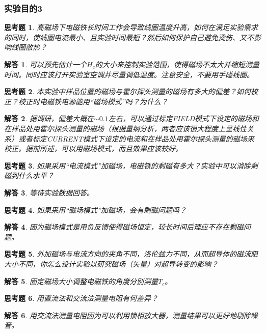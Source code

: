 \documentclass[11pt,a4paper]{ctexart}
\newtheorem{que}{思考题}[section]
\newtheorem{ans}{解答}[section]
\begin{document}
\subsubsection{实验目的3}

\begin{que}
高磁场下电磁铁长时间工作会导致线圈温度升高，如何在满足实验需求的同时，使线圈电流最小、且实验时间最短？然后如何保护自己避免烫伤、又不影响线圈散热？
\end{que}
\begin{ans}
可以预先估计一个$H_c$的大小来控制实验范围，使得磁场不太大并缩短测量时间。同时应该打开实验室空调并尽量调低温度。注意安全，不要用手碰线圈。
\end{ans}

\begin{que}
本实验中样品位置的磁场与霍尔探头测量的磁场有多大的偏差？如何校正？校正时电磁铁电源能用“磁场模式”吗？为什么？
\end{que}
\begin{ans}
据调研，偏差大概在$\sim 0.1$左右，可以通过标定FIELD模式下设定的磁场和在样品处用霍尔探头测量的磁场（根据量纲分析，两者应该很大程度上呈线性关系）或者标定CURRENT模式下设定的电流和在样品处用霍尔探头测量的磁场来校正。据前所述，可以用磁场模式，而且效果应该较好。
\end{ans}

\begin{que}
如果采用“电流模式”加磁场，电磁铁的剩磁有多大？实验中可以消除剩磁到什么水平？
\end{que}
\begin{ans}
等待实验数据回答。
\end{ans}

\begin{que}
如果采用“磁场模式”加磁场，会有剩磁问题吗？
\end{que}
\begin{ans}
因为磁场模式是用负反馈使得磁场恒定，较长时间后理应不存在剩磁问题。
\end{ans}

\begin{que}
外加磁场与电流方向的夹角不同，洛伦兹力不同，从而超导体的磁流阻大小不同，你怎么设计实验以研究磁场（矢量）对超导转变的影响？
\end{que}
\begin{ans}
固定磁场大小调整电磁铁的角度分别测量$T_c$。
\end{ans}

\begin{que}
用直流法和交流法测量电阻有何差异？
\end{que}
\begin{ans}
用交流法测量电阻因为可以利用锁相放大器，测量结果可以更好地剔除噪音。
\end{ans}
\end{document}
